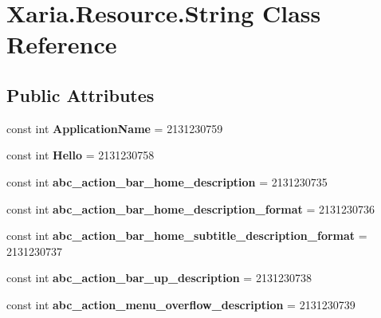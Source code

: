 \hypertarget{classXaria_1_1Resource_1_1String}{}\section{Xaria.\+Resource.\+String Class Reference}
\label{classXaria_1_1Resource_1_1String}
\subsection*{Public Attributes}
\begin{DoxyCompactItemize}
\item 
\mbox{\label{classXaria_1_1Resource_1_1String_a27c46a2c3b46fdbeabfed8f80770a535}} 
const int {\bfseries Application\+Name} = 2131230759
\item 
\mbox{\label{classXaria_1_1Resource_1_1String_abcdd2e3c50cf85102813c06c0cbd3bdf}} 
const int {\bfseries Hello} = 2131230758
\item 
\mbox{\label{classXaria_1_1Resource_1_1String_a3f85f33e17d7c5f07aad993a7b8177da}} 
const int {\bfseries abc\+\_\+action\+\_\+bar\+\_\+home\+\_\+description} = 2131230735
\item 
\mbox{\label{classXaria_1_1Resource_1_1String_a708a9b2784451adcdf2ae0a9c09dde5b}} 
const int {\bfseries abc\+\_\+action\+\_\+bar\+\_\+home\+\_\+description\+\_\+format} = 2131230736
\item 
\mbox{\label{classXaria_1_1Resource_1_1String_ad0a993efcc4bf34ded8955433fb863a7}} 
const int {\bfseries abc\+\_\+action\+\_\+bar\+\_\+home\+\_\+subtitle\+\_\+description\+\_\+format} = 2131230737
\item 
\mbox{\label{classXaria_1_1Resource_1_1String_a7d46053ead4d7859b8913fdd0a8ed592}} 
const int {\bfseries abc\+\_\+action\+\_\+bar\+\_\+up\+\_\+description} = 2131230738
\item 
\mbox{\label{classXaria_1_1Resource_1_1String_a098d9595f1850d0f75d77ff5da0e8c68}} 
const int {\bfseries abc\+\_\+action\+\_\+menu\+\_\+overflow\+\_\+description} = 2131230739

\end{DoxyCompactItemize}
